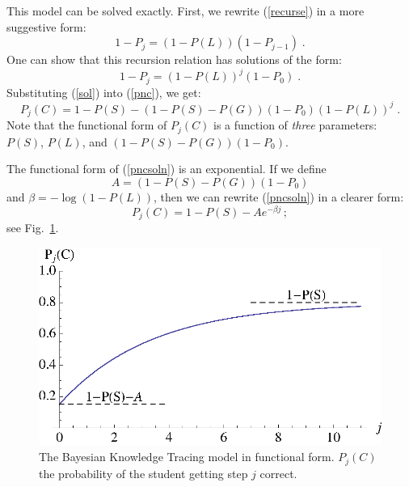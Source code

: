 \documentclass[11pt,letterpaper]{article}
\begin{document}
This model can be  solved exactly.  First, we rewrite (\ref{recurse}) in a
more suggestive form:
%
\begin{equation}
        1-P_j = \left(1-P(L)\right) \left(1-P_{j-1}\right) \; .
\end{equation}
%
One can show that this recursion relation has solutions of the form:
%
\begin{equation}
            1-P_j = \left(1-P(L)\right)^j\left(1-P_0\right) \; .
	    \label{sol}
\end{equation}
%
%
Substituting (\ref{sol}) into (\ref{pnc}), we get:
%
\begin{equation}
         P_j(C) = 1-P(S) -\left(1-P(S)-P(G)\right) \left(1-P_0\right)
                   \left(1-P(L)\right)^j \; . \label{pncsoln}
\end{equation}
%
Note that the functional form of $P_j(C)$ is a function of {\em three}
parameters:  $P(S)$, $P(L)$, and $\left(1-P(S)-P(G)\right) \left(1-P_0\right)$.

The functional form of (\ref{pncsoln}) is an exponential.
If we define
%
\begin{equation} 
          A=\left(1-P(S)-P(G)\right) \left(1-P_0\right)  \label{aa}
\end{equation}
%
 and $\beta=-\log(1-P(L))$, then we can rewrite (\ref{pncsoln}) in 
a clearer form:
%
\begin{equation}
         P_j(C) = 1-P(S) -A e^{-\beta j} \, ;
\end{equation}
%
see Fig.~\ref{bktgraph}.

\begin{figure}
\centering\includegraphics{exponential.eps}
\caption{The Bayesian Knowledge Tracing model in functional form. 
          $P_j(C)$ the probability of  the student getting step $j$ correct.}
 \label{bktgraph}
\end{figure}
\end{document}
